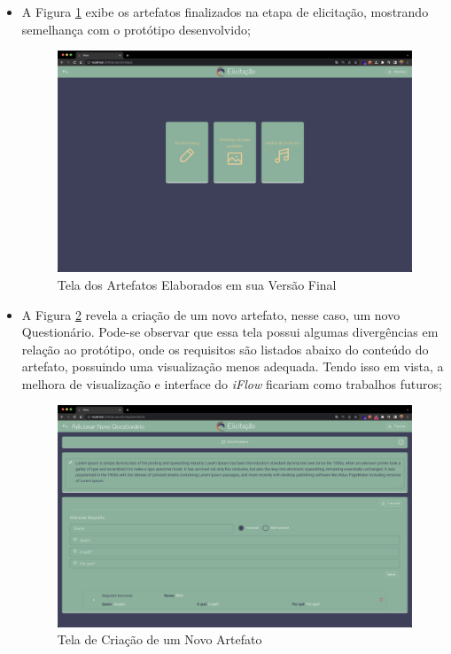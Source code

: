 \begin{itemize}
    \item A Figura \ref{fig:artefatos_completos_implementado} exibe os artefatos finalizados na etapa de elicitação, mostrando semelhança com o protótipo desenvolvido;
    \begin{figure}[]
      \begin{center}
          \caption{{Tela dos Artefatos Elaborados em sua Versão Final}}
          \label{fig:artefatos_completos_implementado}
          \includegraphics[scale=0.24]{figuras/TelasDesenvolvidas/completed-artifacts-implementado.png}
    \end{center}
    \end{figure}
    
    \item A Figura \ref{fig:novo_artefato} revela a criação de um novo artefato, nesse caso, um novo Questionário. Pode-se observar que essa tela possui algumas divergências em relação ao protótipo, onde os requisitos são listados abaixo do conteúdo do artefato, possuindo uma visualização menos adequada. Tendo isso em vista, a melhora de visualização e interface do \textit{iFlow} ficariam como trabalhos futuros;
    \begin{figure}[]
      \begin{center}
          \caption{{Tela de Criação de um Novo Artefato}}
          \label{fig:novo_artefato}
          \includegraphics[scale=0.22]{figuras/TelasDesenvolvidas/new-artifact.png}
    \end{center}
    \end{figure}


\end{itemize}
